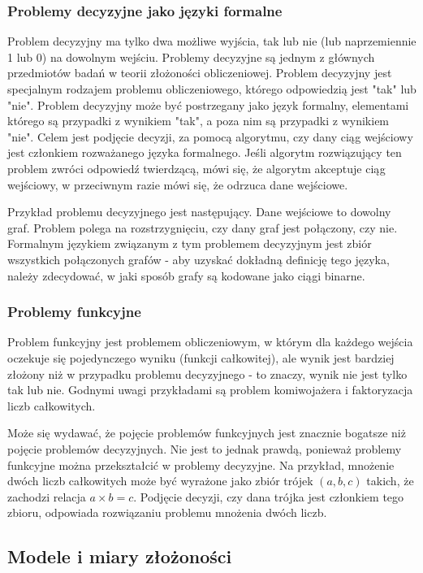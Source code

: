 		\subsubsection{Problemy decyzyjne jako języki formalne}

Problem decyzyjny ma tylko dwa możliwe wyjścia, tak lub nie (lub naprzemiennie 1 lub 0) na dowolnym wejściu.
Problemy decyzyjne są jednym z głównych przedmiotów badań w teorii złożoności obliczeniowej. Problem decyzyjny jest specjalnym rodzajem problemu obliczeniowego, którego odpowiedzią jest "tak" lub "nie". Problem decyzyjny może być postrzegany jako język formalny, elementami którego są przypadki z wynikiem "tak", a poza nim są przypadki z wynikiem "nie". Celem jest podjęcie decyzji, za pomocą algorytmu, czy dany ciąg wejściowy jest członkiem rozważanego języka formalnego. Jeśli algorytm rozwiązujący ten problem zwróci odpowiedź twierdzącą, mówi się, że algorytm akceptuje ciąg wejściowy, w przeciwnym razie mówi się, że odrzuca dane wejściowe.

Przykład problemu decyzyjnego jest następujący. Dane wejściowe to dowolny graf. Problem polega na rozstrzygnięciu, czy dany graf jest połączony, czy nie. Formalnym językiem związanym z tym problemem decyzyjnym jest zbiór wszystkich połączonych grafów - aby uzyskać dokładną definicję tego języka, należy zdecydować, w jaki sposób grafy są kodowane jako ciągi binarne.

		\subsubsection{Problemy funkcyjne}

Problem funkcyjny jest problemem obliczeniowym, w którym dla każdego wejścia oczekuje się pojedynczego wyniku (funkcji całkowitej), ale wynik jest bardziej złożony niż w przypadku problemu decyzyjnego - to znaczy, wynik nie jest tylko tak lub nie. Godnymi uwagi przykładami są problem komiwojażera i faktoryzacja liczb całkowitych.

Może się wydawać, że pojęcie problemów funkcyjnych jest znacznie bogatsze niż pojęcie problemów decyzyjnych. Nie jest to jednak prawdą, ponieważ problemy funkcyjne można przekształcić w problemy decyzyjne. Na przykład, mnożenie dwóch liczb całkowitych może być wyrażone jako zbiór trójek $(a, b, c)$ takich, że zachodzi relacja $a × b = c$. Podjęcie decyzji, czy dana trójka jest członkiem tego zbioru, odpowiada rozwiązaniu problemu mnożenia dwóch liczb.

	\subsection{Modele i miary złożoności}

